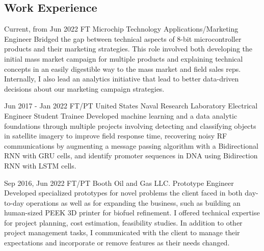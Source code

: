 \documentclass[
	10pt, %
]{FreemanCV}
\begin{document}
\begin{paracol}{2}
\section{Work Experience}





\jobentry
	{Current, from Jun 2022} %
	{FT} %
	{Microchip Technology} %
	{Applications/Marketing Engineer} %
	{ %
		Bridged the gap between technical aspects of 8-bit microcontroller products and their marketing strategies.
		This role involved both developing the initial mass market campaign for multiple products
		and explaining technical concepts in an easily digestible way to the mass market and field sales reps. 
		Internally, I also lead an analytics initiative that lead to better data-driven decisions about our marketing campaign strategies.
	} 


\jobentry
	{Jun 2017 - Jan 2022} %
	{FT/PT} %
	{United States Naval Research Laboratory} %
	{Electrical Engineer Student Trainee} %
	{ %
		Developed machine learning and a data analytic foundations through multiple projects involving
		detecting and classifying objects in satellite imagery to improve field response time,
		recovering noisy RF communications by augmenting a message passing algorithm with a Bidirectional RNN with GRU cells, 
		and identify promoter sequences in DNA using Bidirection RNN with LSTM cells.
	} 


\jobentry
	{Sep 2016, Jun 2022} %
	{FT/PT} %
	{Booth Oil and Gas LLC.} %
	{Prototype Engineer} %
	{ %
		Developed specialized prototypes for novel problems the client faced in both day-to-day operations
		as well as for expanding the business, such as building an human-sized PEEK 3D printer for biofuel refinement.
		I offered technical expertise for project planning, cost estimation, feasibility studies.
		In addition to other project management tasks, I communicated with the client to manage their expectations
		and incorporate or remove features as their needs changed.
	}




\end{paracol}
\end{document}
